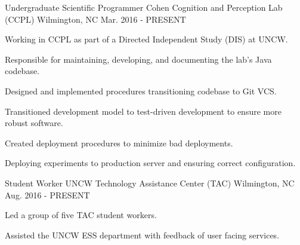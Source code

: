 

\begin{cventries}
  \cventry
    {Undergraduate Scientific Programmer} %
    {Cohen Cognition and Perception Lab (CCPL)} %
    {Wilmington, NC} %
    {Mar. 2016 - PRESENT} %
    {
      \begin{cvitems}
        \item {Working in CCPL as part of a Directed Independent Study (DIS) at UNCW.}
        \item {Responsible for maintaining, developing, and documenting the lab's Java codebase.}
        \item {Designed and implemented procedures transitioning codebase to Git VCS.}
        \item {Transitioned development model to test-driven development to ensure more robust software.}
        \item {Created deployment procedures to minimize bad deployments.}
        \item {Deploying experiments to production server and ensuring correct configuration.}
      \end{cvitems}
    }
  \cventry
    {Student Worker}
    {UNCW Technology Assistance Center (TAC)} %
    {Wilmington, NC} %
    {Aug. 2016 - PRESENT} %
    {
      \begin{cvsubentries}
        {
          \begin{cvsubitems}
            \item {Led a group of five TAC student workers.}
            \item {Assisted the UNCW ESS department with feedback of user facing services.}
          \end{cvsubitems}
        }

\end{cvsubentries}}
\end{cventries}
